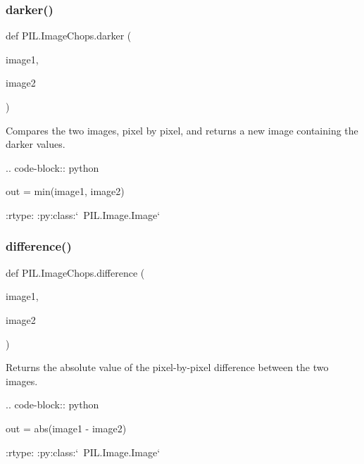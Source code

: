 \subsubsection{\texorpdfstring{darker()}{darker()}}
{\footnotesize\ttfamily def P\+I\+L.\+Image\+Chops.\+darker (\begin{DoxyParamCaption}\item[{}]{image1,  }\item[{}]{image2 }\end{DoxyParamCaption})}

\begin{DoxyVerb}Compares the two images, pixel by pixel, and returns a new image containing
the darker values.

.. code-block:: python

    out = min(image1, image2)

:rtype: :py:class:`~PIL.Image.Image`
\end{DoxyVerb}
 \mbox{\label{namespacePIL_1_1ImageChops_a13657e8e933888ae94db7e855cef72a1}} 
\subsubsection{\texorpdfstring{difference()}{difference()}}
{\footnotesize\ttfamily def P\+I\+L.\+Image\+Chops.\+difference (\begin{DoxyParamCaption}\item[{}]{image1,  }\item[{}]{image2 }\end{DoxyParamCaption})}

\begin{DoxyVerb}Returns the absolute value of the pixel-by-pixel difference between the two
images.

.. code-block:: python

    out = abs(image1 - image2)

:rtype: :py:class:`~PIL.Image.Image`
\end{DoxyVerb}
 \mbox{\label{namespacePIL_1_1ImageChops_ad3963abe16bb89faf0687f813b24cabc}} 
